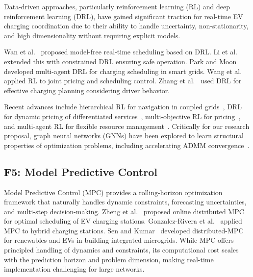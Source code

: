 \documentclass[review]{elsarticle}
\begin{document}
\hspace{0.5cm}Data-driven approaches, particularly reinforcement learning (RL) and deep reinforcement learning (DRL), have gained significant traction for real-time EV charging coordination due to their ability to handle uncertainty, non-stationarity, and high dimensionality without requiring explicit models.

\hspace{0.5cm}Wan et al.~\cite{wan2019modelfree} proposed model-free real-time scheduling based on DRL. Li et al.~\cite{li2020constrained} extended this with constrained DRL ensuring safe operation. Park and Moon~\cite{park2022multiagent} developed multi-agent DRL for charging scheduling in smart grids. Wang et al.~\cite{wang2021rl} applied RL to joint pricing and scheduling control. Zhang et al.~\cite{zhang2020effective} used DRL for effective charging planning considering driver behavior.

\hspace{0.5cm}Recent advances include hierarchical RL for navigation in coupled grids~\cite{jiang2024ev}, DRL for dynamic pricing of differentiated services~\cite{abdalrahman2022dynamic}, multi-objective RL for pricing~\cite{adetunji2024twotailed}, and multi-agent RL for flexible resource management~\cite{wu2024adaptive}. Critically for our research proposal, graph neural networks (GNNs) have been explored to learn structural properties of optimization problems, including accelerating ADMM convergence~\cite{pilco2023learning}.


\subsection{F5: Model Predictive Control}\label{sec:f5}

\hspace{0.5cm}Model Predictive Control (MPC) provides a rolling-horizon optimization framework that naturally handles dynamic constraints, forecasting uncertainties, and multi-step decision-making. Zheng et al.~\cite{zheng2019online} proposed online distributed MPC for optimal scheduling of EV charging stations. Gonzalez-Rivera et al.~\cite{gonzalez2021mpc} applied MPC to hybrid charging stations. Sen and Kumar~\cite{sen2024distributed} developed distributed-MPC for renewables and EVs in building-integrated microgrids. While MPC offers principled handling of dynamics and constraints, its computational cost scales with the prediction horizon and problem dimension, making real-time implementation challenging for large networks.
\end{document}
